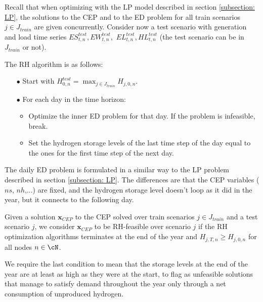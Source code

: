 Recall that when optimizing with the LP model described in section \ref{subsection: LP}, the solutions to the CEP and to the ED problem for all train scenarios $j\in J_{train}$ are given concurrently. 
Consider now a test scenario with generation and load time series $ES^{test}_{t,n}, EW^{test}_{t,n},$ $EL^{test}_{t,n}, HL^{test}_{t,n}$ (the test scenario can be in $J_{train}$ or not).

The RH algorithm is as follows:
\begin{itemize}
\item[$\bullet$] Start with $H_{0,n}^{test} = \max_{j\in J_{train}} H_{j,0,n}$.
\item[$\bullet$] For each day in the time horizon:
\begin{itemize}
\item Optimize the inner ED problem for that day. If the problem is infeasible, break.
\item Set the hydrogen storage levels of the last time step of the day equal to the ones for the first time step of the next day.
\end{itemize}
\end{itemize}

The daily ED problem is formulated in a similar way to the LP problem described in section \ref{subsection: LP}. 
The differences are that the CEP variables ($ns$, $nh$,...) are fixed, and the hydrogen storage level doesn't loop as it did in the year, but it connects to the following day.

\begin{definition}[RH-feasibility]
  Given a solution $\mathbf{x}_{CEP}$ to the CEP solved over train scenarios $j\in J_{train}$ and a test scenario $j$, we consider $\mathbf{x}_{CEP}$ to be RH-feasible over scenario $j$ if the RH optimization algorithms terminates at the end of the year and $H_{j,T,n}\ge H_{j,0,n}$ for all nodes $n\in\cN$.
  \end{definition}
We require the last condition to mean that the storage levels at the end of the year are at least as high as they were at the start, to flag as unfeasible solutions that manage to satisfy demand throughout the year only through a net consumption of unproduced hydrogen.
  
